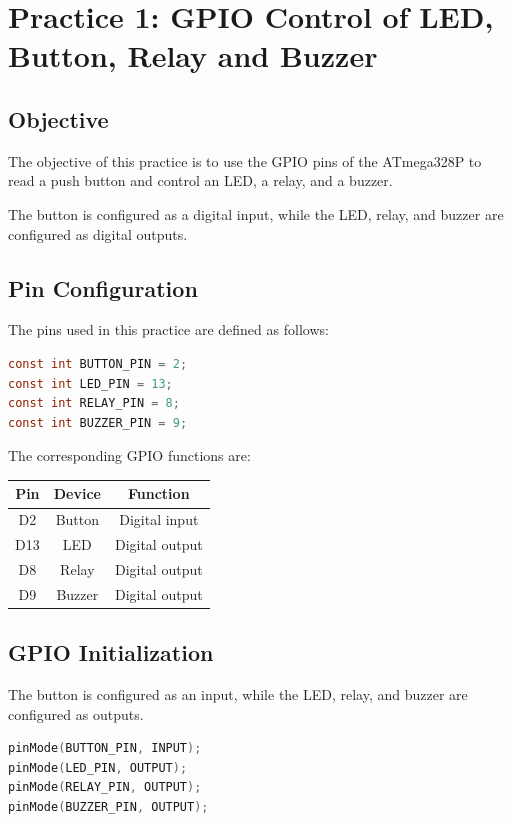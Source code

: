 \documentclass[12pt,a4paper]{article}
\begin{document}
\section{Practice 1: GPIO Control of LED, Button, Relay and Buzzer}

\subsection{Objective}

The objective of this practice is to use the GPIO pins of the ATmega328P
to read a push button and control an LED, a relay, and a buzzer.

The button is configured as a digital input, while the LED, relay, and
buzzer are configured as digital outputs.

\subsection{Pin Configuration}

The pins used in this practice are defined as follows:

\begin{lstlisting}[language=C]
const int BUTTON_PIN = 2;
const int LED_PIN = 13;
const int RELAY_PIN = 8;
const int BUZZER_PIN = 9;
\end{lstlisting}

The corresponding GPIO functions are:

\begin{center}
\begin{tabular}{|c|c|c|}
\hline
\textbf{Pin} & \textbf{Device} & \textbf{Function} \\
\hline
D2 & Button & Digital input \\
\hline
D13 & LED & Digital output \\
\hline
D8 & Relay & Digital output \\
\hline
D9 & Buzzer & Digital output \\
\hline
\end{tabular}
\end{center}

\subsection{GPIO Initialization}

The button is configured as an input, while the LED, relay, and buzzer
are configured as outputs.

\begin{lstlisting}[language=C]
pinMode(BUTTON_PIN, INPUT);
pinMode(LED_PIN, OUTPUT);
pinMode(RELAY_PIN, OUTPUT);
pinMode(BUZZER_PIN, OUTPUT);
\end{lstlisting}
\end{document}
